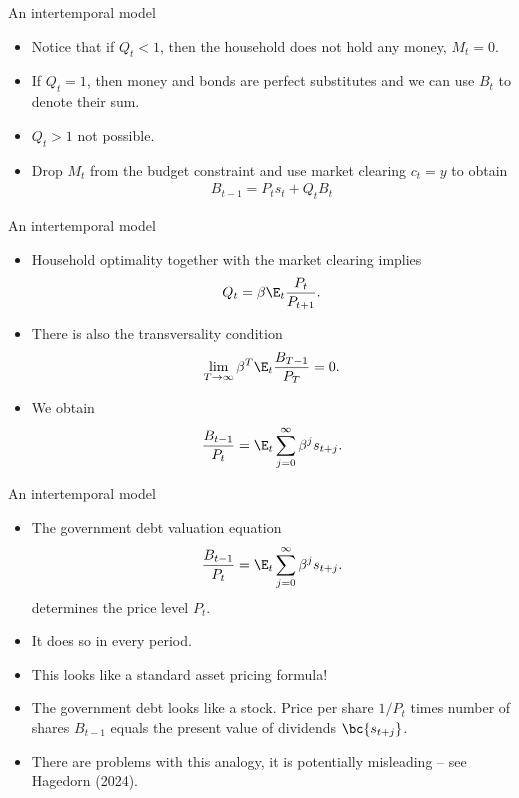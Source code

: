 \documentclass[11pt,xcolor={dvipsnames},aspectratio=159,hyperref={pdftex,pdfpagemode=UseNone,hidelinks,pdfdisplaydoctitle=true},usepdftitle=false]{beamer}
\begin{document}
\begin{frame}{An intertemporal model}
    \begin{itemize}
            \item Notice that if $Q_t < 1$, then the household does not hold any money, $M_t = 0$.
            \item If $Q_t = 1$, then money and bonds are perfect substitutes and we can use $B_t$ to denote their sum.
            \item $Q_t > 1$ not possible. 
            \item Drop $M_t$ from the budget constraint and use market clearing $c_t = y$ to obtain \begin{align*}
                B_{t-1}  = P_t s_t +  Q_t B_t \end{align*}
        \end{itemize}
    \end{frame}

\begin{frame}{An intertemporal model}
    \begin{itemize}
            \item Household optimality together with the market clearing implies \begin{align*}
                Q_t = \beta \E_t \frac{P_t}{P_{t+1}}.
            \end{align*}

            \item There is also the transversality condition 
            \begin{align*}
                \lim_{T\to\infty} \beta^T \E_t \frac{B_{T-1}}{P_T}  = 0.
            \end{align*}
            \item We obtain \begin{align*}
                \frac{B_{t-1}}{P_t}  = \E_t \sum_{j=0}^\infty \beta^j s_{t+j}.
                \end{align*}
        \end{itemize}
    \end{frame}

\begin{frame}{An intertemporal model}
    \begin{itemize}
            \item The government debt valuation equation \begin{align*}
                \frac{B_{t-1}}{P_t}  = \E_t \sum_{j=0}^\infty \beta^j s_{t+j}.
                \end{align*}
                determines the price level $P_t$.
            \item It does so in every period. 
            \item This looks like a standard asset pricing formula! 
            \item The government debt looks like a stock. Price per share $1/P_t$ times number of shares $B_{t-1}$ equals the present value of dividends $\bc{s_{t+j}}$.
            \item There are problems with this analogy, it is potentially misleading -- see Hagedorn (2024). 
        \end{itemize}
    \end{frame}
\end{document}
